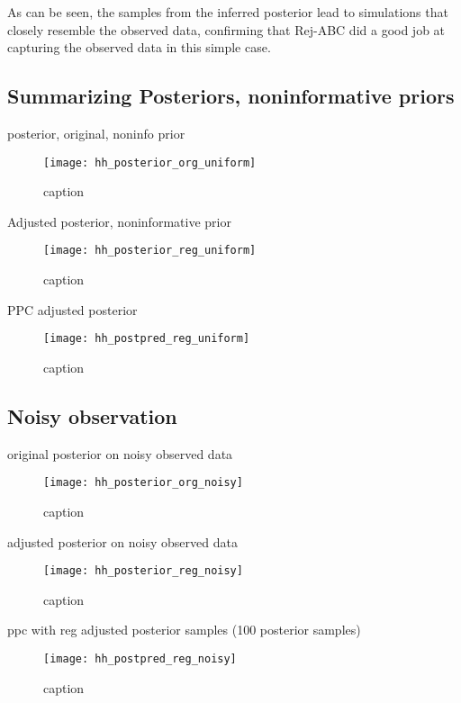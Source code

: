 As can be seen, the samples from the inferred posterior lead to simulations that closely resemble the observed data, confirming that Rej-ABC did a good job at capturing the observed data in this simple case.

\subsection{Summarizing Posteriors, noninformative priors}

posterior, original, noninfo prior

\begin{figure}[H]
    \centering
    \texttt{[image: hh\_posterior\_org\_uniform]}
    \caption{caption}
    \label{fig:fig1}
\end{figure}

Adjusted posterior, noninformative prior

\begin{figure}[H]
    \centering
    \texttt{[image: hh\_posterior\_reg\_uniform]}
    \caption{caption}
    \label{fig:fig1}
\end{figure} 

PPC adjusted posterior 

\begin{figure}[H]
    \centering
    \texttt{[image: hh\_postpred\_reg\_uniform]}
    \caption{caption}
    \label{fig:fig1}
\end{figure}

\subsection{Noisy observation} 

original posterior on noisy observed data

\begin{figure}[H]
    \centering
    \texttt{[image: hh\_posterior\_org\_noisy]}
    \caption{caption}
    \label{fig:fig1}
\end{figure} 

adjusted posterior on noisy observed data

\begin{figure}[H]
    \centering
    \texttt{[image: hh\_posterior\_reg\_noisy]}
    \caption{caption}
    \label{fig:fig1}
\end{figure} 

ppc with reg adjusted posterior samples (100 posterior samples)


\begin{figure}[H]
    \centering
    \texttt{[image: hh\_postpred\_reg\_noisy]}
    \caption{caption}
    \label{fig:fig1}
\end{figure}

